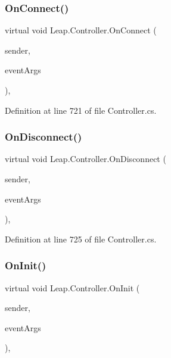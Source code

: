 \subsubsection{\texorpdfstring{OnConnect()}{OnConnect()}}
{\footnotesize\ttfamily virtual void Leap.\+Controller.\+On\+Connect (\begin{DoxyParamCaption}\item[{object}]{sender,  }\item[{\mbox{\hyperlink{class_leap_1_1_connection_event_args}{Connection\+Event\+Args}}}]{event\+Args }\end{DoxyParamCaption})\hspace{0.3cm}{\ttfamily [protected]}, {\ttfamily [virtual]}}



Definition at line 721 of file Controller.\+cs.

\mbox{\label{class_leap_1_1_controller_a06fff0c5313c992da0b84714f561acff}} 
\subsubsection{\texorpdfstring{OnDisconnect()}{OnDisconnect()}}
{\footnotesize\ttfamily virtual void Leap.\+Controller.\+On\+Disconnect (\begin{DoxyParamCaption}\item[{object}]{sender,  }\item[{\mbox{\hyperlink{class_leap_1_1_connection_lost_event_args}{Connection\+Lost\+Event\+Args}}}]{event\+Args }\end{DoxyParamCaption})\hspace{0.3cm}{\ttfamily [protected]}, {\ttfamily [virtual]}}



Definition at line 725 of file Controller.\+cs.

\mbox{\label{class_leap_1_1_controller_a0e0ce4c3c7526305c2a8c79c7f5cd1a7}} 
\subsubsection{\texorpdfstring{OnInit()}{OnInit()}}
{\footnotesize\ttfamily virtual void Leap.\+Controller.\+On\+Init (\begin{DoxyParamCaption}\item[{object}]{sender,  }\item[{\mbox{\hyperlink{class_leap_1_1_leap_event_args}{Leap\+Event\+Args}}}]{event\+Args }\end{DoxyParamCaption})\hspace{0.3cm}{\ttfamily [protected]}, {\ttfamily [virtual]}}



